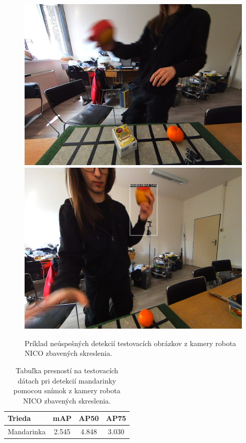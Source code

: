 \begin{figure}[H]
\includegraphics[width=\textwidth]{images/detections_screenshot_clean_wrong1.png}
\includegraphics[width=\textwidth]{images/detections_screenshot_clean_wrong2.png}
\centering
\caption{Príklad neúspešných detekcií testovacích obrázkov z kamery robota NICO zbavených skreslenia.}
\label{fig:image705}
\end{figure}

\begin{table}[H]
\begin{tabular}{|l|c|c|c|}
\hline
\textbf{Trieda} & \textbf{mAP} & \textbf{AP50} & \textbf{AP75} \\
\hline
Mandarinka & 2.545 & 4.848 & 3.030 \\
\hline
\end{tabular}
\centering
\caption{Tabuľka presností na testovacích dátach pri detekcií mandarinky pomocou snímok z kamery robota NICO zbavených skreslenia.}
\label{tab:table701}
\end{table}

